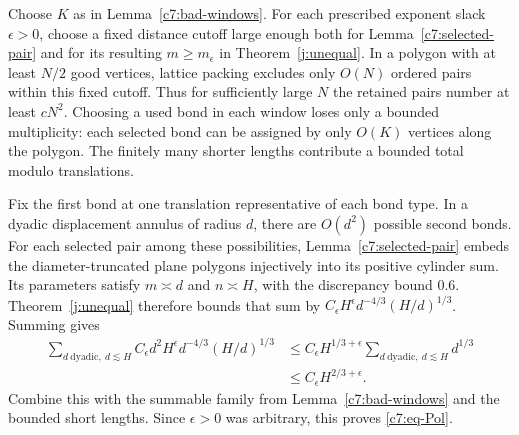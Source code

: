 Choose $K$ as in Lemma~\ref{c7:bad-windows}. For each prescribed
exponent slack $\epsilon>0$, choose a fixed distance cutoff large enough
both for Lemma~\ref{c7:selected-pair} and for its resulting
$m\ge m_\epsilon$ in Theorem~\ref{j:unequal}. In a polygon with at least
$N/2$ good vertices, lattice packing excludes only $O(N)$ ordered pairs
within this fixed cutoff. Thus for sufficiently large $N$ the retained
pairs number at least $cN^2$. Choosing a used bond in each window loses
only a bounded multiplicity: each selected bond can be assigned by only
$O(K)$ vertices along the polygon. The finitely many shorter lengths
contribute a bounded total modulo translations.

Fix the first bond at one translation representative of each bond type.
In a dyadic displacement annulus of radius $d$, there are $O(d^2)$
possible second bonds. For each selected pair among these possibilities,
Lemma~\ref{c7:selected-pair}
embeds the diameter-truncated plane polygons injectively into its
positive cylinder sum. Its parameters satisfy $m\asymp d$ and
$n\asymp H$, with the discrepancy bound $0.6$. Theorem~\ref{j:unequal}
therefore bounds that sum by
$C_\epsilon H^\epsilon d^{-4/3}(H/d)^{1/3}$. Summing gives
\[
\begin{aligned}
 \sum_{d\ \mathrm{dyadic},\ d\lesssim H}
 C_\epsilon d^2H^\epsilon d^{-4/3}(H/d)^{1/3}
 &\le C_\epsilon H^{1/3+\epsilon}
       \sum_{d\ \mathrm{dyadic},\ d\lesssim H}d^{1/3}
 \\&\le C_\epsilon H^{2/3+\epsilon}.
\end{aligned}
\]
Combine this with the summable family from Lemma~\ref{c7:bad-windows}
and the bounded short lengths. Since $\epsilon>0$ was arbitrary, this
proves \eqref{c7:eq-Pol}.
